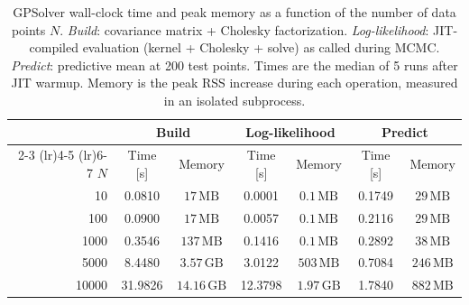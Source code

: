 \begin{table}[ht!]
    \centering
    \caption{GPSolver wall-clock time and peak memory as a function of the number of data points $N$. \textit{Build}: covariance matrix + Cholesky factorization. \textit{Log-likelihood}: JIT-compiled evaluation (kernel + Cholesky + solve) as called during MCMC. \textit{Predict}: predictive mean at 200 test points. Times are the median of 5 runs after JIT warmup. Memory is the peak RSS increase during each operation, measured in an isolated subprocess.}
    \label{tab:gp_solver_speed}
    \begin{tabular}{rcccccc}
    \toprule
    & \multicolumn{2}{c}{Build} & \multicolumn{2}{c}{Log-likelihood} & \multicolumn{2}{c}{Predict} \\
    \cmidrule(lr){2-3} \cmidrule(lr){4-5} \cmidrule(lr){6-7}
    $N$ & Time [s] & Memory & Time [s] & Memory & Time [s] & Memory \\
    \midrule
    10 & 0.0810 & $17\,\text{MB}$ & 0.0001 & $0.1\,\text{MB}$ & 0.1749 & $29\,\text{MB}$ \\
    100 & 0.0900 & $17\,\text{MB}$ & 0.0057 & $0.1\,\text{MB}$ & 0.2116 & $29\,\text{MB}$ \\
    1000 & 0.3546 & $137\,\text{MB}$ & 0.1416 & $0.1\,\text{MB}$ & 0.2892 & $38\,\text{MB}$ \\
    5000 & 8.4480 & $3.57\,\text{GB}$ & 3.0122 & $503\,\text{MB}$ & 0.7084 & $246\,\text{MB}$ \\
    10000 & 31.9826 & $14.16\,\text{GB}$ & 12.3798 & $1.97\,\text{GB}$ & 1.7840 & $882\,\text{MB}$ \\
    \bottomrule
    \end{tabular}
\end{table}